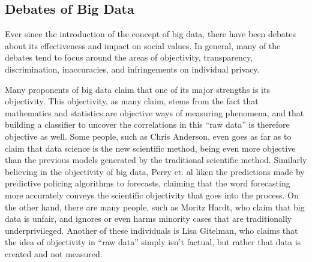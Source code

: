 \documentclass[12pt]{article} %
\begin{document}
\subsection{Debates of Big Data}
Ever since the introduction of the concept of big data, there have been debates about its effectiveness and impact on social values. In general, many of the debates tend to focus around the areas of objectivity, transparency, discrimination, inaccuracies, and infringements on individual privacy.

Many proponents of big data claim that one of its major strengths is its objectivity. This objectivity, as many claim, stems from the fact that mathematics and statistics are objective ways of measuring phenomena, and that building a classifier to uncover the correlations in this ``raw data'' is therefore objective as well. Some people, such as Chris Anderson, even goes as far as to claim that data science is the new scientific method, being even more objective than the previous models generated by the traditional scientific method. \cite{anderson_2008} Similarly believing in the objectivity of big data, Perry et. al liken the predictions made by predictive policing algorithms to forecasts, claiming that the word forecasting more accurately conveys the scientific objectivity that goes into the process. \cite{perryetal} On the other hand, there are many people, such as Moritz Hardt, who claim that big data is unfair, and ignores or even harms minority cases that are traditionally underprivileged. \cite{hardt} Another of these individuals is Lisa Gitelman, who claims that the idea of objectivity in ``raw data'' simply isn't factual, but rather that data is created and not measured. \cite{gitelman2013raw}
\end{document}
